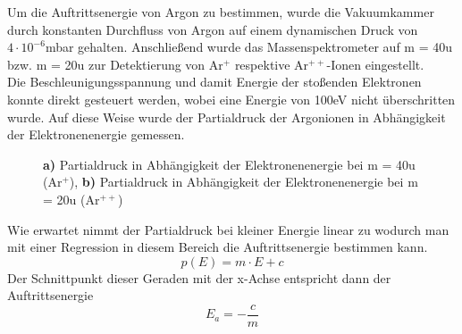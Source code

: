 Um die Auftrittsenergie von Argon zu bestimmen, wurde die Vakuumkammer durch konstanten Durchfluss von Argon auf einem dynamischen Druck von $4\cdot 10^{-6}$\;mbar gehalten.
Anschließend wurde das Massenspektrometer auf m = 40\;u bzw. m = 20\;u zur Detektierung von Ar$^{+}$ respektive Ar$^{++}$-Ionen eingestellt.\\
Die Beschleunigungsspannung und damit Energie der stoßenden Elektronen konnte direkt gesteuert werden, wobei eine Energie von 100\;eV nicht überschritten wurde.
Auf diese Weise wurde der Partialdruck der Argonionen in Abhängigkeit der Elektronenenergie gemessen.

\begin{figure}[h]
	\centering
	\caption{\textbf{a)} Partialdruck in Abhängigkeit der Elektronenenergie bei m = 40\;u (Ar$^+$), \textbf{b)} Partialdruck in Abhängigkeit der Elektronenenergie bei m = 20\;u (Ar$^{++}$)}
	\label{fig:plot_argon}
\end{figure}

Wie erwartet nimmt der Partialdruck bei kleiner Energie linear zu wodurch man mit einer Regression in diesem Bereich die Auftrittsenergie bestimmen kann.
\begin{equation}
	p(E) = m\cdot E + c
\end{equation}
Der Schnittpunkt dieser Geraden mit der x-Achse entspricht dann der Auftrittsenergie
\begin{equation}
	E_a = -\frac{c}{m}
\end{equation}


